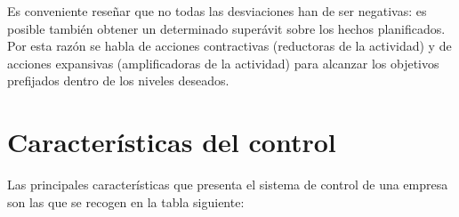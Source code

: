 \documentclass[
]{krantz}
\begin{document}
Es conveniente reseñar que no todas las desviaciones han de ser negativas: es posible también obtener un determinado superávit sobre los hechos planificados. Por esta razón se habla de acciones contractivas (reductoras de la actividad) y de acciones expansivas (amplificadoras de la actividad) para alcanzar los objetivos prefijados dentro de los niveles deseados.

\hypertarget{caracteruxedsticas-del-control}{%
\section{Características del control}\label{caracteruxedsticas-del-control}}

Las principales características que presenta el sistema de control de una empresa son las que se recogen en la tabla siguiente:
\end{document}
